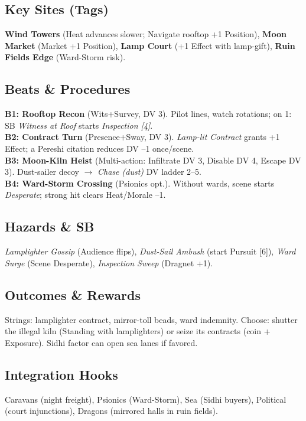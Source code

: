\documentclass[11pt]{article}
\begin{document}
\subsection*{Key Sites (Tags)}
\textbf{Wind Towers} (Heat advances slower; Navigate rooftop +1 Position), 
\textbf{Moon Market} (Market +1 Position), 
\textbf{Lamp Court} (+1 Effect with lamp-gift),
\textbf{Ruin Fields Edge} (Ward-Storm risk).

\subsection*{Beats \& Procedures}
\textbf{B1: Rooftop Recon} (Wits+Survey, DV 3). Pilot lines, watch rotations; on 1: SB \emph{Witness at Roof} starts \emph{Inspection [4]}.\\
\textbf{B2: Contract Turn} (Presence+Sway, DV 3). \emph{Lamp-lit Contract} grants +1 Effect; a Pereshi citation reduces DV --1 once/scene.\\
\textbf{B3: Moon-Kiln Heist} (Multi-action: Infiltrate DV 3, Disable DV 4, Escape DV 3). Dust-sailer decoy $\rightarrow$ \emph{Chase (dust)} DV ladder 2--5.\\
\textbf{B4: Ward-Storm Crossing} (Psionics opt.). Without wards, scene starts \emph{Desperate}; strong hit clears Heat/Morale --1.

\subsection*{Hazards \& SB}
\emph{Lamplighter Gossip} (Audience flips), 
\emph{Dust-Sail Ambush} (start Pursuit [6]), 
\emph{Ward Surge} (Scene Desperate), 
\emph{Inspection Sweep} (Dragnet +1).

\subsection*{Outcomes \& Rewards}
Strings: lamplighter contract, mirror-toll beads, ward indemnity. Choose: shutter the illegal kiln (Standing with lamplighters) or seize its contracts (coin + Exposure). Sidhi factor can open sea lanes if favored.

\subsection*{Integration Hooks}
Caravans (night freight), Psionics (Ward-Storm), Sea (Sidhi buyers), Political (court injunctions), Dragons (mirrored halls in ruin fields).

\end{document}
